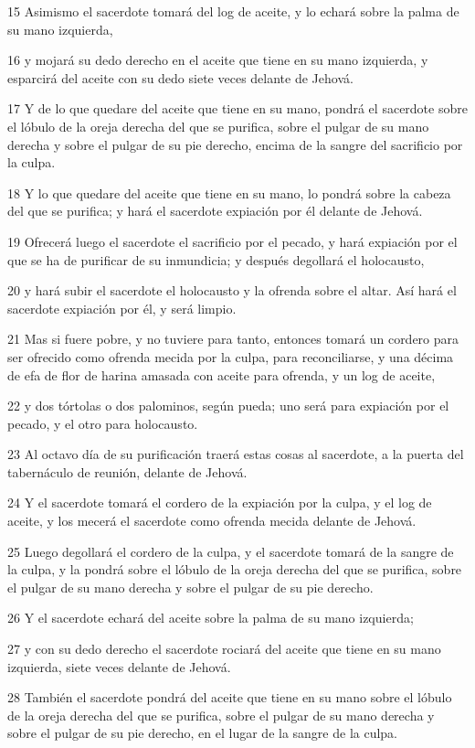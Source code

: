 \par 15 Asimismo el sacerdote tomará del log   de aceite, y lo echará sobre la palma de su mano izquierda,
\par 16 y mojará su dedo derecho en el aceite que tiene en su mano izquierda, y esparcirá del aceite con su dedo siete veces delante de Jehová.
\par 17 Y de lo que quedare del aceite que tiene en su mano, pondrá el sacerdote sobre el lóbulo de la oreja derecha del que se purifica, sobre el pulgar de su mano derecha y sobre el pulgar de su pie derecho, encima de la sangre del sacrificio por la culpa.
\par 18 Y lo que quedare del aceite que tiene en su mano, lo pondrá sobre la cabeza del que se purifica; y hará el sacerdote expiación por él delante de Jehová.
\par 19 Ofrecerá luego el sacerdote el sacrificio por el pecado, y hará expiación por el que se ha de purificar de su inmundicia; y después degollará el holocausto,
\par 20 y hará subir el sacerdote el holocausto y la ofrenda sobre el altar. Así hará el sacerdote expiación por él, y será limpio.
\par 21 Mas si fuere pobre, y no tuviere para tanto, entonces tomará un cordero para ser ofrecido como ofrenda mecida por la culpa, para reconciliarse, y una décima de efa   de flor de harina amasada con aceite para ofrenda, y un log de aceite,
\par 22 y dos tórtolas o dos palominos, según pueda; uno será para expiación por el pecado, y el otro para holocausto.
\par 23 Al octavo día de su purificación traerá estas cosas al sacerdote, a la puerta del tabernáculo de reunión, delante de Jehová.
\par 24 Y el sacerdote tomará el cordero de la expiación por la culpa, y el log   de aceite, y los mecerá el sacerdote como ofrenda mecida delante de Jehová.
\par 25 Luego degollará el cordero de la culpa, y el sacerdote tomará de la sangre de la culpa, y la pondrá sobre el lóbulo de la oreja derecha del que se purifica, sobre el pulgar de su mano derecha y sobre el pulgar de su pie derecho.
\par 26 Y el sacerdote echará del aceite sobre la palma de su mano izquierda;
\par 27 y con su dedo derecho el sacerdote rociará del aceite que tiene en su mano izquierda, siete veces delante de Jehová.
\par 28 También el sacerdote pondrá del aceite que tiene en su mano sobre el lóbulo de la oreja derecha del que se purifica, sobre el pulgar de su mano derecha y sobre el pulgar de su pie derecho, en el lugar de la sangre de la culpa.
